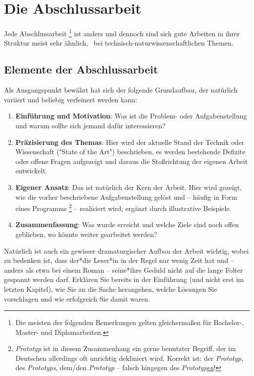 \chapter{Die Abschlussarbeit}
\label{cha:Abschlussarbeit}

Jede Abschlussarbeit%
\footnote{Die meisten der folgenden Bemerkungen gelten gleichermaßen für
Bachelor-, Master- und Diplomarbeiten.}
ist anders und dennoch sind sich gute Arbeiten in ihrer Struktur meist sehr
ähnlich, \va\ bei technisch-natur\-wissen\-schaft\-lichen Themen.

\section{Elemente der Abschlussarbeit}

Als Ausgangspunkt bewährt hat sich der folgende Grundaufbau, der natürlich 
vari\-iert und beliebig verfeinert werden kann:
%
\begin{enumerate}
    \item \textbf{Einführung und Motivation}: Was ist die Problem- oder
    Aufgabenstellung und
    warum sollte sich jemand dafür interessieren?
    \item \textbf{Präzisierung des Themas}: Hier wird der aktuelle Stand der
    Technik oder Wissenschaft ("State of the Art") beschrieben, es werden
    bestehende Defizite oder offene Fragen aufgezeigt und daraus die
    Stoßrichtung der eigenen Arbeit entwickelt.
    \item \textbf{Eigener Ansatz}: Das ist natürlich der Kern der Arbeit. Hier
    wird gezeigt, wie die vorher beschriebene Aufgabenstellung gelöst und --
    häufig in Form eines Programms%
    \footnote{\emph{Prototyp} ist in diesem Zusammenhang ein gerne benutzter
    Begriff, der im Deutschen allerdings oft unrichtig dekliniert wird.
    Korrekt ist: der \emph{Prototyp}, des \emph{Prototyps}, dem/den
    \emph{Prototyp} -- falsch hingegen des \emph{Prototyp\underline{en}}!}
    -- realisiert wird, ergänzt durch illustrative Beispiele.
    \item \textbf{Zusammenfassung}: Was wurde erreicht und welche Ziele sind
    noch offen geblieben, wo könnte weiter gearbeitet werden?
\end{enumerate}
%
Natürlich ist auch ein gewisser dramaturgischer Aufbau der Arbeit wichtig,
wobei zu bedenken ist, dass der*die Leser*in in der Regel nur wenig Zeit hat
und -- anders als etwa bei einem Roman -- seine*ihre Geduld nicht auf die
lange Folter gespannt werden darf. Erklären Sie bereits in der Einführung
(und nicht erst im letzten Kapitel), wie Sie an die Sache herangehen, welche
Lösungen Sie vorschlagen und wie erfolgreich Sie damit waren.

